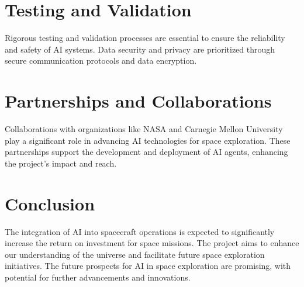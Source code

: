 \documentclass[12pt]{article}
\begin{document}
\section{Testing and Validation}
Rigorous testing and validation processes are essential to ensure the reliability and safety of AI systems. Data security and privacy are prioritized through secure communication protocols and data encryption.

\section{Partnerships and Collaborations}
Collaborations with organizations like NASA and Carnegie Mellon University play a significant role in advancing AI technologies for space exploration. These partnerships support the development and deployment of AI agents, enhancing the project's impact and reach.

\section{Conclusion}
The integration of AI into spacecraft operations is expected to significantly increase the return on investment for space missions. The project aims to enhance our understanding of the universe and facilitate future space exploration initiatives. The future prospects for AI in space exploration are promising, with potential for further advancements and innovations.
\end{document}
